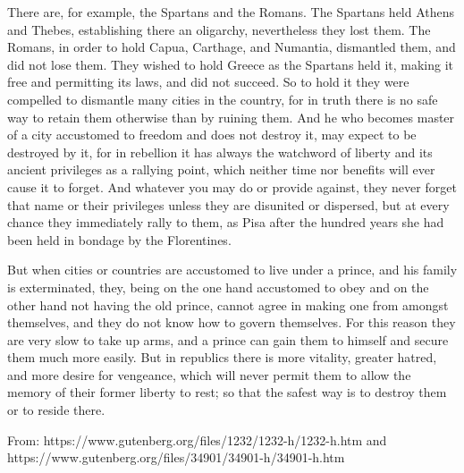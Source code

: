 \begin{linenumbers*}
\indent There are, for example, the Spartans and the Romans. The Spartans held Athens and Thebes, establishing there an oligarchy, nevertheless they lost them. The Romans, in order to hold Capua, Carthage, and Numantia, dismantled them, and did not lose them. They wished to hold Greece as the Spartans held it, making it free and permitting its laws, and did not succeed. So to hold it they were compelled to dismantle many cities in the country, for in truth there is no safe way to retain them otherwise than by ruining them. And he who becomes master of a city accustomed to freedom and does not destroy it, may expect to be destroyed by it, for in rebellion it has always the watchword of liberty and its ancient privileges as a rallying point, which neither time nor benefits will ever cause it to forget. And whatever you may do or provide against, they never forget that name or their privileges unless they are disunited or dispersed, but at every chance they immediately rally to them, as Pisa after the hundred years she had been held in bondage by the Florentines.

\indent But when cities or countries are accustomed to live under a prince, and his family is exterminated, they, being on the one hand accustomed to obey and on the other hand not having the old prince, cannot agree in making one from amongst themselves, and they do not know how to govern themselves. For this reason they are very slow to take up arms, and a prince can gain them to himself and secure them much more easily. But in republics there is more vitality, greater hatred, and more desire for vengeance, which will never permit them to allow the memory of their former liberty to rest; so that the safest way is to destroy them or to reside there.
\end{linenumbers*}

From: https://www.gutenberg.org/files/1232/1232-h/1232-h.htm and https://www.gutenberg.org/files/34901/34901-h/34901-h.htm

